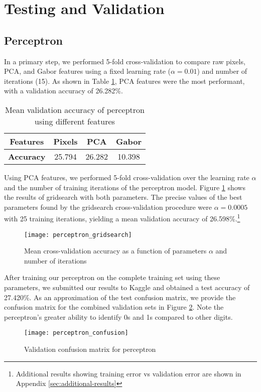 \documentclass{acm_proc_article-sp}
\begin{document}
\section{Testing and Validation}%

\subsection{Perceptron}
In a primary step, we performed 5-fold cross-validation to compare raw pixels, PCA, and Gabor features using a fixed learning rate ($\alpha = 0.01$) and number of iterations (15). As shown in Table \ref{tab:perc-features}, PCA features were the most performant, with a validation accuracy of 26.282\%.
\begin{table}[h!]
  \centering
  \begin{tabular}{|c||c|c|c| }
    \hline
    {\bfseries Features} & Pixels & PCA & Gabor \\
    \hline
    {\bfseries Accuracy} & 25.794 & 26.282 & 10.398 \\
    \hline
  \end{tabular}
  \caption{Mean validation accuracy of perceptron using different features}
  \label{tab:perc-features}
\end{table}

Using PCA features, we performed 5-fold cross-validation over the learning rate $\alpha$ and the number of training iterations of the perceptron model. Figure \ref{fig:perc-gridsearch} shows the results of gridsearch with both parameters. The precise values of the best parameters found by the gridsearch cross-validation procedure were $\alpha = 0.0005$ with 25 training iterations, yielding a mean validation accuracy of 26.598\%.\footnote{Additional results showing training error vs validation error are shown in Appendix \ref{sec:additional-results}}
\begin{figure}[h!]
	\centering
	\texttt{[image: perceptron\_gridsearch]}
  	\caption{Mean cross-validation accuracy as a function of parameters $\alpha$ and number of iterations}
  	\label{fig:perc-gridsearch}
\end{figure}

After training our perceptron on the complete training set using these parameters, we submitted our results to Kaggle and obtained a test accuracy of 27.420\%. As an approximation of the test confusion matrix, we provide the confusion matrix for the combined validation sets in Figure \ref{fig:perc-confusion}. Note the perceptron's greater ability to identify 0s and 1s compared to other digits.
\begin{figure}[h!]
	\centering
	\texttt{[image: perceptron\_confusion]}
  	\caption{Validation confusion matrix for perceptron}
  	\label{fig:perc-confusion}
\end{figure}
\end{document}
